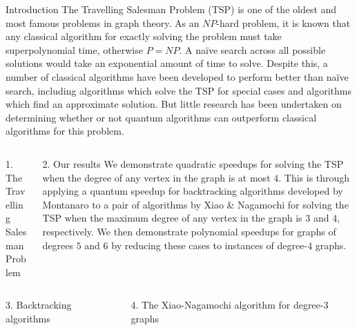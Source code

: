 \documentclass[]{templates/poster}
\begin{document}

\begin{frame}{} 

\begin{columns}[t]
  \begin{column}{0.900\linewidth}
  \begin{block}{\Large Introduction}
  The Travelling Salesman Problem (TSP) is one of the oldest and most famous problems in graph theory. As an $NP$-hard problem, it is known that any classical algorithm for exactly solving the problem must take superpolynomial time, otherwise $P = NP$. A na\"ive search across all possible solutions would take an exponential amount of time to solve. Despite this, a number of classical algorithms have been developed to perform better than na\"ive search, including algorithms which solve the TSP for special cases and algorithms which find an approximate solution. But little research has been undertaken on determining whether or not quantum algorithms can outperform classical algorithms for this problem.
  \end{block}
  \end{column}
\end{columns}

\begin{columns}[t]
  \begin{column}{0.422\linewidth}
  \begin{block}{\Large 1. The Travelling Salesman Problem}
  \end{block}
  \end{column}

  \begin{column}{0.422\linewidth}
  \begin{block}{\Large 2. Our results}
  We demonstrate quadratic speedups for solving the TSP when the degree of any vertex in the graph is at most $4$. This is through applying a quantum speedup for backtracking algorithms developed by Montanaro to a pair of algorithms by Xiao \& Nagamochi for solving the TSP when the maximum degree of any vertex in the graph is $3$ and $4$, respectively. We then demonstrate polynomial speedups for graphs of degrees $5$ and $6$ by reducing these cases to instances of degree-$4$ graphs.
  \end{block}
  \end{column}
\end{columns}

\begin{columns}[t]
  \begin{column}{0.422\linewidth}
  \begin{block}{\Large 3. Backtracking algorithms}
  \end{block}
  \end{column}
  \begin{column}{0.422\linewidth}
  \begin{block}{\Large 4. The Xiao-Nagamochi algorithm for degree-3 graphs}
  \end{block}
  \end{column}
\end{columns}


\end{frame}
\end{document}
